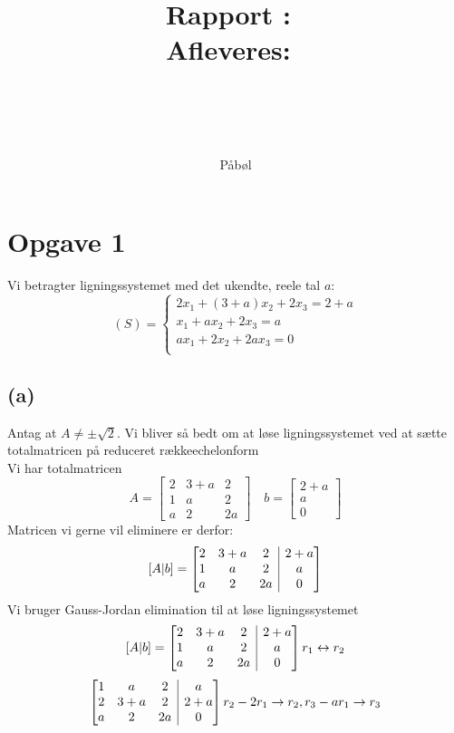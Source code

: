 \documentclass[a4paper,fleqn]{article}
\title{Rapport}
\author{P\aa b\o l}
\title{
	\vspace{2in}
	\textmd{\textbf{\hmwkClass:\ \hmwkTitle}}\\
	\normalsize\vspace{0.1in}\small{Afleveres:\ \hmwkDueDate}\\
	\vspace{0.1in}\large{\textit{\hmwkClassInstructor}}\\
	\normalsize\vspace{0.5in} \hmwkProblem  \\
	\vspace{3in}
}
\author{\textbf{\hmwkAuthorName}}
\begin{document}
	\maketitle
	\newpage
	\setcounter{page}{1}
	\section{Opgave 1}
	Vi betragter ligningssystemet med det ukendte, reele tal $a$:
	\[ (S) = \left\{\begin{matrix}
			2x_1 + (3+a)x_2 + 2x_3 = 2+a\\
			x_1 + ax_2 + 2x_3 = a\\
			ax_1 + 2x_2 + 2ax_3 = 0\\
	\end{matrix}\right.\]
	\subsection{(a)}
	Antag at $A \neq \pm \sqrt{2}$. Vi bliver så bedt om at løse ligningssystemet ved at sætte
	totalmatricen på reduceret rækkeechelonform\\
	Vi har totalmatricen \[A = \begin{bmatrix}2&3+a&2\\1&a&2\\a&2&2a\end{bmatrix} \quad 
	b = \begin{bmatrix}2+a \\ a \\ 0\end{bmatrix} \]
	Matricen vi gerne vil eliminere er derfor:
	\[ [A|b] = \left[\begin{array}{@{}ccc|c@{}}2&3+a&2 & 2+a\\1&a&2 & a\\a&2&2a & 0\end{array} \right]\]
	Vi bruger Gauss-Jordan elimination til at løse ligningssystemet\\
	\[ [A|b] = \left[\begin{array}{@{}ccc|c@{}}
		2	&	3+a	&	2	& 2+a\\
		1	&	a	&	2	& a\\
		a	&	2	&	2a	& 0
	\end{array} \right] r_1 \leftrightarrow r_2 \]
	\[ \left[\begin{array}{@{}ccc|c@{}}
		1	&	a	&	2	& a\\
		2	&	3+a	&	2	& 2+a\\
		a	&	2	&	2a	& 0
	\end{array} \right] r_2 - 2r_1 \rightarrow r_2, r_3 -ar_1 \rightarrow r_3\]
\end{document}
